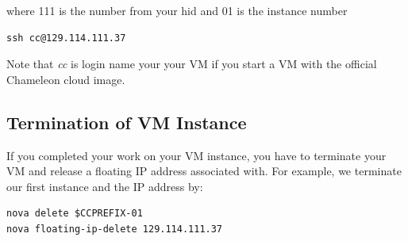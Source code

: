 where 111 is the number from your hid and 01 is the instance number

\begin{lstlisting}
ssh cc@129.114.111.37
\end{lstlisting}

Note that \textit{cc} is login name your your VM if you start a VM
with the official Chameleon cloud image.

\subsection{Termination of VM Instance}

If you completed your work on your VM instance, you have to terminate
your VM and release a floating IP address associated with. For
example, we terminate our first instance and the IP address by:

\begin{lstlisting}
nova delete $CCPREFIX-01
nova floating-ip-delete 129.114.111.37
\end{lstlisting}



